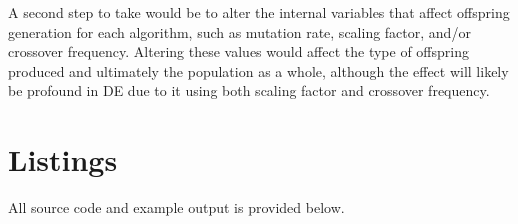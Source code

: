 \documentclass{sig-alternate}
\begin{document}
A second step to take would be to alter the internal variables that affect offspring generation for each algorithm, such as mutation rate, scaling factor, and/or crossover frequency.  Altering these values would affect the type of offspring produced and ultimately the population as a whole, although the effect will likely be profound in DE due to it using both scaling factor and crossover frequency.






\section{Listings}
All source code and example output is provided below.
\end{document}
